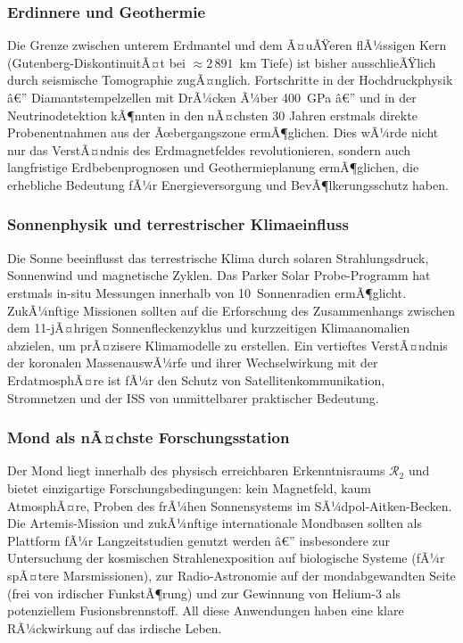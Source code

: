 ﻿\documentclass[a4paper,12pt]{article}
\theoremstyle{definition}
\begin{document}
\subsubsection{Erdinnere und Geothermie}

Die Grenze zwischen unterem Erdmantel und dem Ã¤uÃŸeren flÃ¼ssigen Kern
(Gutenberg-DiskontinuitÃ¤t bei $\approx 2\,891$~km Tiefe) ist bisher
ausschlieÃŸlich durch seismische Tomographie zugÃ¤nglich. Fortschritte in der
Hochdruckphysik â€” Diamantstempelzellen mit DrÃ¼cken Ã¼ber 400~GPa â€” und in der
Neutrinodetektion kÃ¶nnten in den nÃ¤chsten 30 Jahren erstmals direkte
Probenentnahmen aus der Ãœbergangszone ermÃ¶glichen. Dies wÃ¼rde nicht nur das
VerstÃ¤ndnis des Erdmagnetfeldes revolutionieren, sondern auch langfristige
Erdbebenprognosen und Geothermieplanung ermÃ¶glichen, die erhebliche Bedeutung
fÃ¼r Energieversorgung und BevÃ¶lkerungsschutz haben.

\subsubsection{Sonnenphysik und terrestrischer Klimaeinfluss}

Die Sonne beeinflusst das terrestrische Klima durch solaren Strahlungsdruck,
Sonnenwind und magnetische Zyklen. Das Parker Solar Probe-Programm hat
erstmals in-situ Messungen innerhalb von 10~Sonnenradien ermÃ¶glicht.
ZukÃ¼nftige Missionen sollten auf die Erforschung des Zusammenhangs zwischen
dem 11-jÃ¤hrigen Sonnenfleckenzyklus und kurzzeitigen Klimaanomalien abzielen,
um prÃ¤zisere Klimamodelle zu erstellen. Ein vertieftes VerstÃ¤ndnis der
koronalen MassenauswÃ¼rfe und ihrer Wechselwirkung mit der ErdatmosphÃ¤re ist
fÃ¼r den Schutz von Satellitenkommunikation, Stromnetzen und der ISS von
unmittelbarer praktischer Bedeutung.

\subsubsection{Mond als nÃ¤chste Forschungsstation}

Der Mond liegt innerhalb des physisch erreichbaren Erkenntnisraums
$\mathcal{R}_2$ und bietet einzigartige Forschungsbedingungen: kein Magnetfeld,
kaum AtmosphÃ¤re, Proben des frÃ¼hen Sonnensystems im SÃ¼dpol-Aitken-Becken.
Die Artemis-Mission und zukÃ¼nftige internationale Mondbasen sollten als
Plattform fÃ¼r Langzeitstudien genutzt werden â€” insbesondere zur Untersuchung
der kosmischen Strahlenexposition auf biologische Systeme (fÃ¼r spÃ¤tere
Marsmissionen), zur Radio-Astronomie auf der mondabgewandten Seite (frei von
irdischer FunkstÃ¶rung) und zur Gewinnung von Helium-3 als potenziellem
Fusionsbrennstoff. All diese Anwendungen haben eine klare RÃ¼ckwirkung auf das
irdische Leben.
\end{document}
